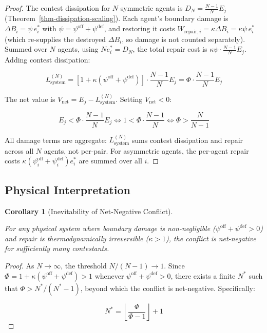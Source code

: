 \documentclass[11pt]{article}
\theoremstyle{plain}
\newtheorem{corollary}[theorem]{Corollary}
\theoremstyle{definition}
\theoremstyle{remark}
\let\origsubsection\subsection
\renewcommand{\subsection}{\needspace{7\baselineskip}\origsubsection}
\begin{document}
\begin{proof}
The contest dissipation for $N$ symmetric agents is $D_N = \frac{N-1}{N} E_j$ (Theorem~\ref{thm-dissipation-scaling}). Each agent's boundary damage is $\Delta B_i = \psi \, e_i^*$ with $\psi = \psi^{\text{off}} + \psi^{\text{def}}$, and restoring it costs $W_{\text{repair},i} = \kappa \Delta B_i = \kappa \psi \, e_i^*$ (which re-supplies the destroyed $\Delta B_i$, so damage is not counted separately). Summed over $N$ agents, using $N e_i^* = D_N$, the total repair cost is $\kappa \psi \cdot \frac{N-1}{N} E_j$. Adding contest dissipation:

$$L_{\text{system}}^{(N)} = \left[1 + \kappa(\psi^{\text{off}} + \psi^{\text{def}})\right] \cdot \frac{N-1}{N} E_j = \Phi \cdot \frac{N-1}{N} E_j$$

The net value is $V_{\text{net}} = E_j - L_{\text{system}}^{(N)}$. Setting $V_{\text{net}} < 0$:

$$E_j < \Phi \cdot \frac{N-1}{N} E_j \iff 1 < \Phi \cdot \frac{N-1}{N} \iff \Phi > \frac{N}{N-1}$$

All damage terms are aggregate: $L_{\text{system}}^{(N)}$ sums contest dissipation and repair across all $N$ agents, not per-pair. For asymmetric agents, the per-agent repair costs $\kappa(\psi_i^{\text{off}} + \psi_i^{\text{def}}) e_i^*$ are summed over all $i$.
\end{proof}

\subsection{Physical
Interpretation}\label{physical-interpretation-net-negative}

\begin{corollary}[Inevitability of Net-Negative Conflict]
\label{cor-inevitability-net-negative}

For any physical system where boundary damage is non-negligible ($\psi^{\text{off}} + \psi^{\text{def}} > 0$) and repair is thermodynamically irreversible ($\kappa > 1$), the conflict is net-negative for sufficiently many contestants.
\end{corollary}

\begin{proof}
As $N \to \infty$, the threshold $N/(N-1) \to 1$. Since $\Phi = 1 + \kappa(\psi^{\text{off}} + \psi^{\text{def}}) > 1$ whenever $\psi^{\text{off}} + \psi^{\text{def}} > 0$, there exists a finite $N^*$ such that $\Phi > N^*/(N^* - 1)$, beyond which the conflict is net-negative. Specifically:

$$N^* = \left\lfloor \frac{\Phi}{\Phi - 1} \right\rfloor + 1$$
\end{proof}
\end{document}
